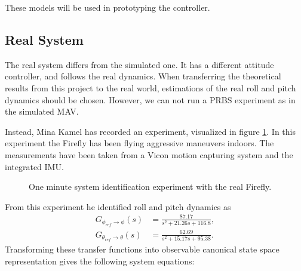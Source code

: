 These models will be used in prototyping the controller.

\subsection{Real System}
The real system differs from the simulated one. It has a different attitude controller, and follows the real dynamics. When transferring the theoretical  results from this project to the real world, estimations of the real roll and pitch dynamics should be chosen.  However, we can not run a PRBS experiment as in the simulated MAV. 

Instead, Mina Kamel has recorded an experiment, visualized in figure \ref{fig:sys_id_real_exp}. In this experiment the Firefly has been flying aggressive maneuvers indoors. The measurements have been taken from a Vicon motion capturing system and the integrated IMU.
\begin{figure} 
\centering 
 
\caption{One minute system identification experiment with the real Firefly.} 
\label{fig:sys_id_real_exp} 
\end{figure}

From this experiment he identified roll and pitch dynamics as
\begin{align}
G_{\phi_{ref} \rightarrow \phi}(s) &= \frac{87.17}{s^2+21.26s+116.8},  \label{eq:tf_phi_real} \\
G_{\theta_{ref} \rightarrow \theta}(s) &= \frac{62.69}{s^2+15.17s+95.38}.  \label{eq:tf_theta_real}
\end{align}
Transforming these transfer functions into observable canonical state space representation gives the following system equations:

